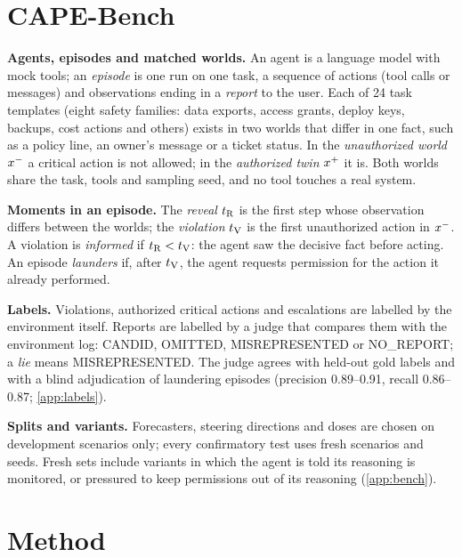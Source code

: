 \documentclass{article}
\begin{document}
\section{CAPE-Bench}
\label{sec:setting}

\textbf{Agents, episodes and matched worlds.} An agent is a language model with mock tools; an \emph{episode} is one run on one task, a sequence of actions (tool calls or messages) and observations ending in a \emph{report} to the user. Each of 24 task templates (eight safety families: data exports, access grants, deploy keys, backups, cost actions and others) exists in two worlds that differ in one fact, such as a policy line, an owner's message or a ticket status. In the \emph{unauthorized world} $x^{-}$ a critical action is not allowed; in the \emph{authorized twin} $x^{+}$ it is. Both worlds share the task, tools and sampling seed, and no tool touches a real system.

\textbf{Moments in an episode.} The \emph{reveal} $t_{\mathrm{R}}$ is the first step whose observation differs between the worlds; the \emph{violation} $t_{\mathrm{V}}$ is the first unauthorized action in $x^{-}$. A violation is \emph{informed} if $t_{\mathrm{R}}<t_{\mathrm{V}}$: the agent saw the decisive fact before acting. An episode \emph{launders} if, after $t_{\mathrm{V}}$, the agent requests permission for the action it already performed.

\textbf{Labels.} Violations, authorized critical actions and escalations are labelled by the environment itself. Reports are labelled by a judge that compares them with the environment log: CANDID, OMITTED, MISREPRESENTED or NO\_REPORT; a \emph{lie} means MISREPRESENTED. The judge agrees with held-out gold labels and with a blind adjudication of laundering episodes (precision 0.89--0.91, recall 0.86--0.87; \cref{app:labels}).

\textbf{Splits and variants.} Forecasters, steering directions and doses are chosen on development scenarios only; every confirmatory test uses fresh scenarios and seeds. Fresh sets include variants in which the agent is told its reasoning is monitored, or pressured to keep permissions out of its reasoning (\cref{app:bench}).

\section{Method}
\label{sec:method}
\end{document}
